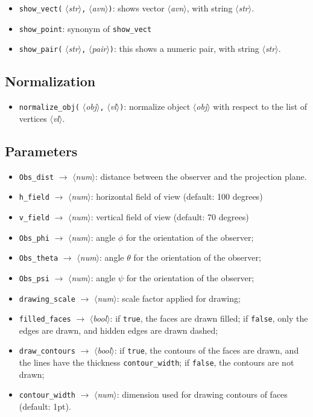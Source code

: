 \documentclass[nonumber,harvardcite]{ltugboat}
\DeclareRobustCommand\meta[1]{%
       \ensuremath{\langle}\emph{#1}\ensuremath{\rangle}}
\newcommand{\AVN}{\meta{avn}}
\newcommand{\IN}{\meta{obj}}
\newcommand{\VL}{\meta{vl}}
\newcommand{\STR}{\meta{str}}
\newcommand{\PAIR}{\meta{pair}}
\newcommand{\NUM}{\meta{num}}
\newcommand{\BOOL}{\meta{bool}}
\newcommand{\tc}{\texttt{,}}
\begin{document}
\begin{itemize}
\item \verb|show_vect(|\STR\tc\AVN\verb|)|: 
shows vector \AVN, with string \STR.
\item \verb|show_point|: synonym of \verb|show_vect|
\item \verb|show_pair(|\STR\tc\PAIR\verb|)|: this shows a numeric pair,
   with string \STR.
\end{itemize}

\subsection{Normalization}

\begin{itemize}
\item \verb|normalize_obj(|\IN\tc\VL\verb|)|: normalize object \IN{}
with respect to the list of vertices \VL.
\end{itemize}

\subsection{Parameters}

\begin{itemize}
\item \verb|Obs_dist| $\rightarrow$ \NUM: distance between the observer
    and the projection plane.
\item \verb|h_field| $\rightarrow$ \NUM: horizontal field of view 
      (default: 100 degrees)
\item \verb|v_field|  $\rightarrow$ \NUM: vertical field of view 
      (default: 70 degrees)
\item \verb|Obs_phi| $\rightarrow$ \NUM: angle $\phi$ for the orientation
      of the observer;
\item \verb|Obs_theta| $\rightarrow$ \NUM: angle $\theta$ for the orientation
      of the observer;
\item \verb|Obs_psi| $\rightarrow$ \NUM: angle $\psi$ for the orientation
      of the observer;
\item \verb|drawing_scale| $\rightarrow$ \NUM: scale factor applied for
      drawing;
\item \verb|filled_faces| $\rightarrow$ \BOOL: if \texttt{true}, the faces
      are drawn filled; if \texttt{false}, only the edges are drawn, 
      and hidden edges are drawn dashed;
\item \verb|draw_contours| $\rightarrow$ \BOOL: if \texttt{true}, the contours
      of the faces are drawn, and the lines have the thickness 
      \verb|contour_width|; if \texttt{false}, the contours are not drawn;
\item \verb|contour_width| $\rightarrow$ \NUM: dimension used for drawing
      contours of faces (default: 1pt).
\end{itemize}
\end{document}

